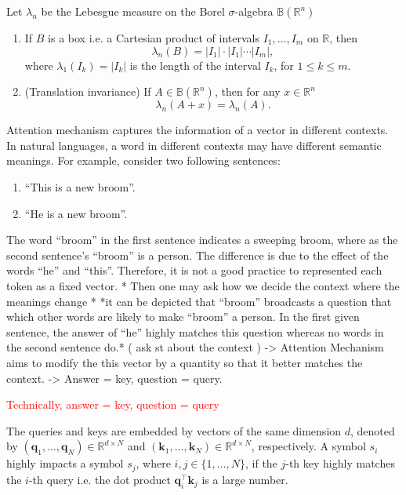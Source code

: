 \begin{theorem}
    Let $\lambda_n$ be the Lebesgue measure on the Borel $\sigma$-algebra $\mathbb{B}(\mathbb{R}^n)$
    \begin{enumerate}
        \item If $B$ is a box i.e. a Cartesian product of intervals $I_1,...,I_m$ on $\mathbb{R}$, then
              $$\lambda_n(B)=|I_1|\cdot|I_1|\cdots|I_m|,$$
              where $\lambda_1(I_k)=|I_k|$ is the length of the interval $I_k$, for $1\le k\le m$.
        \item (Translation invariance) If $A\in \mathbb{B}(\mathbb{R}^n)$, then for any $x\in\mathbb{R}^n$
              $$\lambda_n(A+x)=\lambda_n(A).$$
    \end{enumerate}
\end{theorem}

Attention mechanism captures the information of a vector in different contexts. In natural languages, a word in different contexts may have different semantic meanings. For example, consider two following sentences:
\begin{enumerate}
    \item ``This is a new broom''.
    \item ``He is a new broom''.
\end{enumerate}
The word ``broom'' in the first sentence indicates a sweeping broom, where as the second sentence's ``broom'' is a person. The difference is due to the effect of the words ``he'' and ``this''. Therefore, it is not a good practice to represented each token as a fixed vector. * Then one may ask how we decide the context where the meanings change * *it can be depicted that ``broom'' broadcasts a question that which other words are likely to make ``broom'' a person. In the first given sentence, the answer of ``he'' highly matches this question whereas no words in the second sentence do.* ( ask st about the context ) -> Attention Mechanism aims to modify the this vector by a quantity so that it better matches the context. -> Answer = key, question = query.


\textcolor{red}{Technically, answer = key, question = query}

The queries and keys are embedded by vectors of the same dimension $d$, denoted by $(\mathbf{q}_1,\ldots, \mathbf{q}_N)\in\mathbb{R}^{d\times N}$ and $(\mathbf{k}_1,\ldots, \mathbf{k}_N)\in\mathbb{R}^{d\times N}$, respectively. A symbol $s_i$ highly impacts a symbol $s_j$, where $i,j\in\{1,\ldots, N\}$, if the $j$-th key highly matches the $i$-th query i.e. the dot product $\mathbf{q}_i^\top\mathbf{k}_j$ is a large number.


